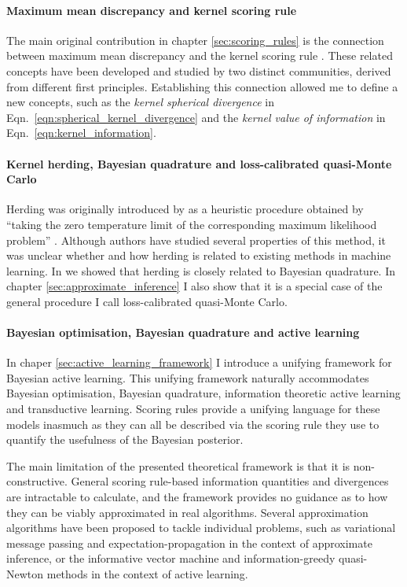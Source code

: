 \paragraph{Maximum mean discrepancy and kernel scoring rule} The main original contribution in chapter \ref{sec:scoring_rules} is the connection between maximum mean discrepancy \citep{Gretton2012} and the kernel scoring rule \citep{Jose2008}. These related concepts have been developed and studied by two distinct communities, derived from different first principles. Establishing this connection allowed me to define a new concepts, such as the \emph{kernel spherical divergence} in Eqn.\ \eqref{eqn:spherical_kernel_divergence} and the \emph{kernel value of information} in Eqn.\ \eqref{eqn:kernel_information}.

\paragraph{Kernel herding, Bayesian quadrature and loss-calibrated quasi-Monte Carlo} Herding was originally introduced by \citet{welling2009herding} as a heuristic procedure obtained by ``taking the zero temperature limit of the corresponding maximum likelihood problem'' \citep[quoted from][]{welling2009herding}. Although authors have studied several properties of this method, it was unclear whether and how herding is related to existing methods in machine learning. In \citep{Huszar2012herding} we showed that herding is closely related to Bayesian quadrature. In chapter \ref{sec:approximate_inference} I also show that it is a special case of the general procedure I call loss-calibrated quasi-Monte Carlo.

\paragraph{Bayesian optimisation, Bayesian quadrature and active learning} In chaper \ref{sec:active_learning_framework} I introduce a unifying framework for Bayesian active learning. This unifying framework naturally accommodates Bayesian optimisation, Bayesian quadrature, information theoretic active learning and transductive learning. Scoring rules provide a unifying language for these models inasmuch as they can all be described via the scoring rule they use to quantify the usefulness of the Bayesian posterior.

\vspace{11pt}

The main limitation of the presented theoretical framework is that it is non-constructive. General scoring rule-based information quantities and divergences are intractable to calculate, and the framework provides no guidance as to how they can be viably approximated in real algorithms. Several approximation algorithms have been proposed to tackle individual problems, such as variational message passing \citep{Winn2006} and expectation-propagation \citep{Minka2001} in the context of approximate inference, or the informative vector machine \citep{Lawrence2004} and information-greedy quasi-Newton methods \citep{Hennig2012newton} in the context of active learning.

